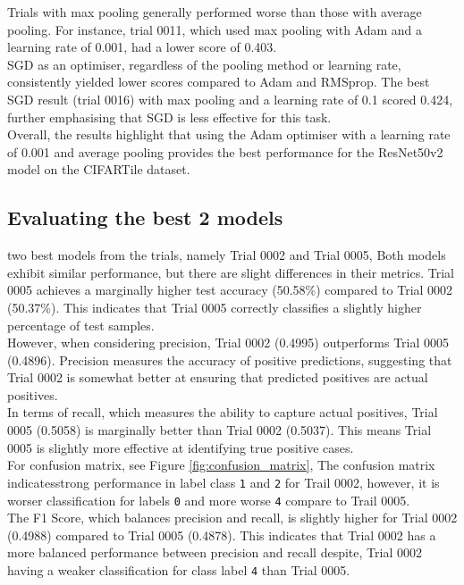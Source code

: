 \documentclass{article}
\begin{document}
Trials with max pooling generally performed worse than those with
average pooling. For instance, trial 0011, which used max
pooling with Adam and a learning rate of 0.001, had a lower
score of 0.403.\\

SGD as an optimiser, regardless of the pooling method or learning rate,
consistently yielded lower scores compared to Adam and RMSprop.
The best SGD result (trial 0016) with max pooling and a learning rate
of 0.1 scored 0.424, further emphasising that SGD is less effective for
this task.\\

Overall, the results highlight that using the Adam optimiser
with a learning rate of 0.001 and average pooling provides the best
performance for the ResNet50v2 model on the CIFARTile dataset.

\subsection{Evaluating the best 2 models}

two best models from the trials, namely Trial 0002 and Trial 0005,
Both models exhibit similar performance, but there are slight 
differences in their metrics. Trial 0005 achieves a marginally
higher test accuracy (50.58\%) compared to Trial 0002 (50.37\%).
This indicates that Trial 0005 correctly classifies a slightly
higher percentage of test samples.\\

However, when considering precision, Trial 0002 (0.4995) outperforms
Trial 0005 (0.4896). Precision measures the accuracy of positive
predictions, suggesting that Trial 0002 is somewhat better at ensuring
that predicted positives are actual positives.\\

In terms of recall, which measures the ability to capture actual
positives, Trial 0005 (0.5058) is marginally better than Trial 0002
(0.5037). This means Trial 0005 is slightly more effective at identifying
true positive cases.\\

For confusion matrix, see Figure \ref{fig:confusion_matrix}, The confusion 
matrix indicatesstrong performance in label class \texttt{1} and \texttt{2}
for Trail 0002, however, it is worser classification for labels 
\texttt{0} and more worse \texttt{4} compare to Trail 0005.\\

The F1 Score, which balances precision and recall,
is slightly higher for Trial 0002 (0.4988) compared
to Trial 0005 (0.4878). This indicates that Trial 0002 has
a more balanced performance between precision and recall despite,
Trial 0002 having a weaker classification for class label 
\texttt{4} than Trial 0005.
\end{document}
